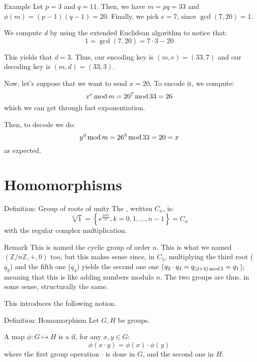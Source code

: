 \documentclass[a4paper]{article}
\begin{document}
\begin{parag}{Example}
    Let $p = 3$ and $q = 11$. Then, we have $m = pq = 33$ and $\phi\left(m\right) = \left(p-1\right)\left(q-1\right) = 20$. Finally, we pick $e = 7$, since $\gcd\left(7, 20\right) = 1$.

    We compute $d$ by using the extended Euclidean algorithm to notice that: 
    \[1 = \gcd\left(7, 20\right) = 7\cdot 3 - 20\]
    
    This yields that $d = 3$. Thus, our encoding key is $\left(m, e\right) = \left(33, 7\right)$ and our decoding key is $\left(m, d\right) = \left(33, 3\right)$.

    Now, let's suppose that we want to send $x = 20$. To encode it, we compute: 
    \[x^e \operatorname{mod} m = 20^7 \operatorname{mod} 33 = 26 \]
    which we can get through fast exponentiation.
    
    Then, to decode we do: 
    \[y^d \operatorname{mod} m = 26^3 \operatorname{mod} 33 = 20 = x\]
    as expected.
\end{parag}

\section{Homomorphisms}

\begin{parag}{Definition: Group of roots of unity}
    The , written $C_n$, is: 
    \[\sqrt[n]{1} = \left\{e^{\frac{2\pi k i}{n}}, k = 0, 1, \ldots, n-1\right\} = C_n\]
    with the regular complex multiplication.
    
    \begin{subparag}{Remark}
        This is named the cyclic group of order $n$. This is what we named $\left(\mathbb{Z}/n\mathbb{Z}, +, 0\right)$ too, but this makes sense since, in $C_5$, multiplying the third root ($q_2$) and the fifth one ($q_4$) yields the second one one ($q_2 \cdot  q_4 = q_{\left(2 + 4\right) \Mod 5} = q_{1}$); meaning that this is like adding numbers modulo $n$. The two groups are thus, in some sense, structurally the same.

        This introduces the following notion.
    \end{subparag}
\end{parag}

\begin{parag}{Definition: Homomorphism}
    Let $G, H$ be groups.

    A map $\phi: G \mapsto H$ is a  if, for any $x, y \in G$: 
    \[\phi\left(x\cdot y\right) = \phi\left(x\right)\cdot \phi\left(y\right)\]
    where the first group operation $\cdot $ is done in $G$, and the second one in $H$.
\end{parag}
\end{document}
